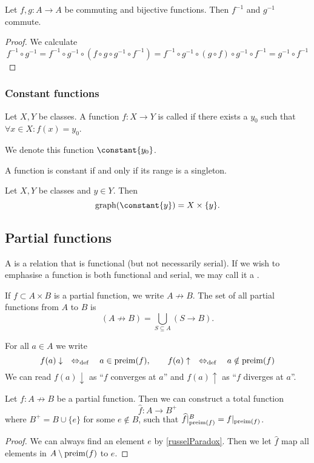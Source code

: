 \begin{lemma} \label{commutationInverse}
Let $f, g:A\to A$ be commuting and bijective functions. Then $f^{-1}$ and $g^{-1}$ commute.
\end{lemma}
\begin{proof}
We calculate
\[ f^{-1}\circ g^{-1} = f^{-1}\circ g^{-1}\circ (f\circ g \circ g^{-1} \circ f^{-1}) = f^{-1}\circ g^{-1}\circ (g\circ f) \circ g^{-1} \circ f^{-1} = g^{-1} \circ f^{-1} \]
\end{proof}

\subsubsection{Constant functions}
\begin{definition}
Let $X,Y$ be classes. A function $f:X\to Y$ is called  if there exists a $y_0$ such that $\forall x\in X: f(x) = y_0$.

We denote this function $\constant{y_0}$.
\end{definition}

A function is constant if and only if its range is a singleton.

\begin{lemma}
Let $X,Y$ be classes and $y\in Y$. Then
\[ \graph(\constant{y}) = X\times \{y\}. \]
\end{lemma}

\subsection{Partial functions}
\begin{definition}
A  is a relation that is functional (but not necessarily serial). If we wish to emphasise a function is both functional and serial, we may call it a .
\end{definition}
If $f\subset A\times B$ is a partial function, we write $A\not \to B$. The set of all partial functions from $A$ to $B$ is
\[ (A\not \to B) = \bigcup _{S\subseteq A}(S\to B). \]

For all $a\in A$ we write
\[ f(a)\downarrow \quad\Leftrightarrow_{\text{def}}\quad a\in\operatorname{preim}(f),\qquad f(a)\uparrow \quad\Leftrightarrow_{\text{def}}\quad a\notin\operatorname{preim}(f) \]
We can read $f(a)\downarrow$ as ``$f$ converges at $a$'' and $f(a)\uparrow$ as ``$f$ diverges at $a$''.

\begin{lemma} \label{partialFunctionExtension}
Let $f: A \not\to B$ be a partial function. Then we can construct a total function
\[ \widehat{f}: A \to B^+ \]
where $B^+ = B\cup \{e\}$ for some $e\notin B$, such that $\widehat{f}|_{\operatorname{preim}(f)}^B = f|_{\operatorname{preim}(f)}$.
\end{lemma}
\begin{proof}
We can always find an element $e$ by \ref{russelParadox}. Then we let $\widehat{f}$ map all elements in $A\setminus\operatorname{preim}(f)$ to $e$.
\end{proof}


